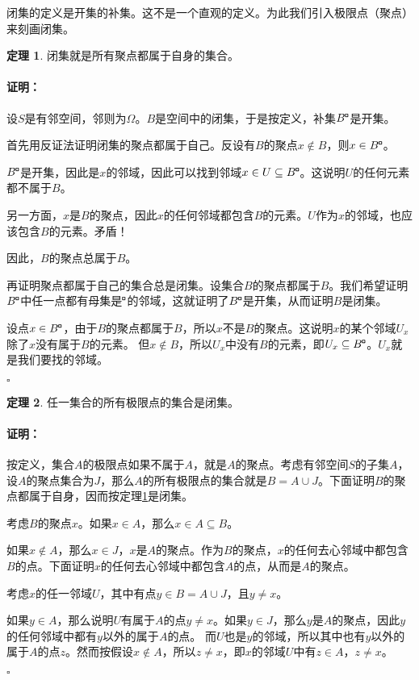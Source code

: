 \documentclass[12pt,UTF8]{ctexbook}
\newcommand{\bu}{\mathbin{\text{\tikz[baseline=-0.6ex]{
    \node[draw, fill=black, minimum size=0.8ex, inner sep=0pt, rectangle] (bu) {};
    \node[draw=none, fill=white, minimum size=0.6ex, inner sep=0pt, circle] at (bu.center) {};
}}}}
\theoremstyle{definition}
\newtheorem{tm}{定理}[section]
\theoremstyle{plain}
\renewenvironment{proof}{\paragraph{\textbf{证明：}}}{\hfill$\square$}
\begin{document}
\begin{appendix}
闭集的定义是开集的补集。这不是一个直观的定义。为此我们引入极限点（聚点）来刻画闭集。

\begin{tm}\label{tm:a-2-0}
    闭集就是所有聚点都属于自身的集合。
\end{tm}

\begin{proof}
    设$S$是有邻空间，邻则为$\Omega$。$B$是空间中的闭集，于是按定义，补集$B^{\bu}$是开集。

    首先用反证法证明闭集的聚点都属于自己。反设有$B$的聚点$x\notin B$，则$x\in B^{\bu}$。

    $B^{\bu}$是开集，因此是$x$的邻域，因此可以找到邻域$x\in U \subseteq B^{\bu}$。这说明$U$的任何元素都不属于$B$。

    另一方面，$x$是$B$的聚点，因此$x$的任何邻域都包含$B$的元素。$U$作为$x$的邻域，也应该包含$B$的元素。矛盾！

    因此，$B$的聚点总属于$B$。

    再证明聚点都属于自己的集合总是闭集。设集合$B$的聚点都属于$B$。我们希望证明$B^{\bu}$中任一点都有母集是$^{\bu}$的邻域，这就证明了$B^{\bu}$是开集，从而证明$B$是闭集。

    设点$x\in B^{\bu}$，由于$B$的聚点都属于$B$，所以$x$不是$B$的聚点。这说明$x$的某个邻域$U_x$除了$x$没有属于$B$的元素。
    但$x \notin B$，所以$U_x$中没有$B$的元素，即$U_x\subseteq B^{\bu}$。$U_x$就是我们要找的邻域。

\end{proof}

\begin{tm}\label{tm:a-2-10}
    任一集合的所有极限点的集合是闭集。
\end{tm}

\begin{proof}
    按定义，集合$A$的极限点如果不属于$A$，就是$A$的聚点。考虑有邻空间$S$的子集$A$，
    设$A$的聚点集合为$J$，那么$A$的所有极限点的集合就是$B = A\cup J$。下面证明$B$的聚点都属于自身，因而按定理\ref{tm:a-2-0}是闭集。

    考虑$B$的聚点$x$。如果$x\in A$，那么$x\in A\subseteq B$。
    
    如果$x\notin A$，那么$x\in J$，$x$是$A$的聚点。作为$B$的聚点，$x$的任何去心邻域中都包含$B$的点。下面证明$x$的任何去心邻域中都包含$A$的点，从而是$A$的聚点。
    
    考虑$x$的任一邻域$U$，其中有点$y\in B = A\cup J$，且$y\neq x$。

    如果$y \in A$，那么说明$U$有属于$A$的点$y\neq x$。如果$y \in J$，那么$y$是$A$的聚点，因此$y$的任何邻域中都有$y$以外的属于$A$的点。
    而$U$也是$y$的邻域，所以其中也有$y$以外的属于$A$的点$z$。然而按假设$x\notin A$，所以$z \neq x$，即$x$的邻域$U$中有$z\in A$，$z\neq x$。


\end{proof}
\end{appendix}
\end{document}
